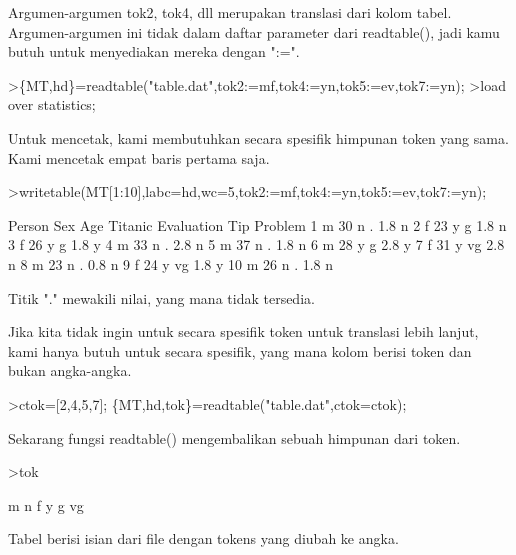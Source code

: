 \documentclass[a4paper,10pt]{article}
\begin{document}
\begin{eulernotebook}
\begin{eulercomment}
Argumen-argumen tok2, tok4, dll merupakan translasi dari kolom tabel. Argumen-argumen ini
tidak dalam daftar parameter dari readtable(), jadi kamu butuh untuk menyediakan mereka
dengan ":=".
\end{eulercomment}
\begin{eulerprompt}
>\{MT,hd\}=readtable("table.dat",tok2:=mf,tok4:=yn,tok5:=ev,tok7:=yn);
>load over statistics;
\end{eulerprompt}
\begin{eulercomment}
Untuk mencetak, kami membutuhkan secara spesifik himpunan token yang sama. Kami mencetak
empat baris pertama saja.
\end{eulercomment}
\begin{eulerprompt}
>writetable(MT[1:10],labc=hd,wc=5,tok2:=mf,tok4:=yn,tok5:=ev,tok7:=yn);
\end{eulerprompt}
\begin{euleroutput}
   Person  Sex  Age Titanic Evaluation  Tip Problem
        1    m   30       n          .  1.8       n
        2    f   23       y          g  1.8       n
        3    f   26       y          g  1.8       y
        4    m   33       n          .  2.8       n
        5    m   37       n          .  1.8       n
        6    m   28       y          g  2.8       y
        7    f   31       y         vg  2.8       n
        8    m   23       n          .  0.8       n
        9    f   24       y         vg  1.8       y
       10    m   26       n          .  1.8       n
\end{euleroutput}
\begin{eulercomment}
Titik "." mewakili nilai, yang mana tidak tersedia.

Jika kita tidak ingin untuk secara spesifik token untuk translasi lebih lanjut, kami hanya
butuh untuk secara spesifik, yang mana kolom berisi token dan bukan angka-angka.
\end{eulercomment}
\begin{eulerprompt}
>ctok=[2,4,5,7]; \{MT,hd,tok\}=readtable("table.dat",ctok=ctok);
\end{eulerprompt}
\begin{eulercomment}
Sekarang fungsi readtable() mengembalikan sebuah himpunan dari token.
\end{eulercomment}
\begin{eulerprompt}
>tok
\end{eulerprompt}
\begin{euleroutput}
  m
  n
  f
  y
  g
  vg
\end{euleroutput}
\begin{eulercomment}
Tabel berisi isian dari file dengan tokens yang diubah ke angka.


\end{eulercomment}
\end{eulernotebook}
\end{document}

